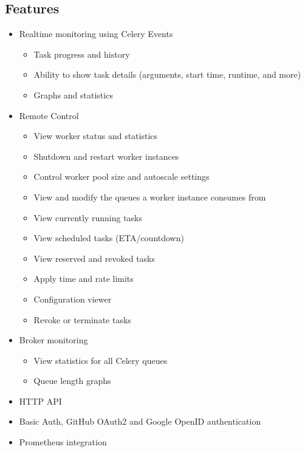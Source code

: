 \documentclass[letterpaper,10pt,english]{sphinxmanual}
\begin{document}
\subsection{Features}
\label{\detokenize{features:features}}\label{\detokenize{features::doc}}\begin{itemize}
\item {} 
Real\sphinxhyphen{}time monitoring using Celery Events
\begin{itemize}
\item {} 
Task progress and history

\item {} 
Ability to show task details (arguments, start time, runtime, and more)

\item {} 
Graphs and statistics

\end{itemize}

\item {} 
Remote Control
\begin{itemize}
\item {} 
View worker status and statistics

\item {} 
Shutdown and restart worker instances

\item {} 
Control worker pool size and autoscale settings

\item {} 
View and modify the queues a worker instance consumes from

\item {} 
View currently running tasks

\item {} 
View scheduled tasks (ETA/countdown)

\item {} 
View reserved and revoked tasks

\item {} 
Apply time and rate limits

\item {} 
Configuration viewer

\item {} 
Revoke or terminate tasks

\end{itemize}

\item {} 
Broker monitoring
\begin{itemize}
\item {} 
View statistics for all Celery queues

\item {} 
Queue length graphs

\end{itemize}

\item {} 
HTTP API

\item {} 
Basic Auth, GitHub OAuth2 and Google OpenID authentication

\item {} 
Prometheus integration

\end{itemize}
\end{document}
